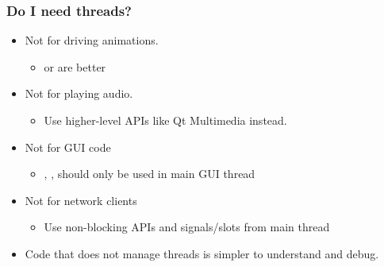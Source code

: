 \begin{slide}
\frametitle{Do I need threads?}
\begin{itemize}
    \item Not for driving animations. 
    \begin{itemize}
        \item {} or  are better
    \end{itemize}
    \item Not for playing audio.
        \begin{itemize}
        \item Use higher-level APIs like Qt Multimedia instead.
        \end{itemize}
    \item Not for GUI code
        \begin{itemize}
        \item {}, , should only be used in main GUI thread
        \end{itemize}
    \item Not for network clients
        \begin{itemize}
        \item Use non-blocking APIs and signals/slots from main thread
        \end{itemize}
    \item Code that does not manage threads is simpler to understand and debug.
\end{itemize}
\end{slide}


